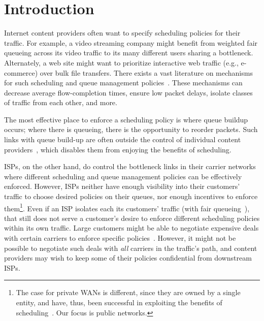 \section{Introduction}\label{s:intro}

Internet content providers often want to specify scheduling policies for their traffic. 
For example, a video streaming company might benefit from weighted fair queueing across its video traffic to its many different users sharing a bottleneck. Alternately, a web site might want to prioritize interactive web traffic (e.g., e-commerce) over bulk file transfers. 
There exists a vast literature on mechanisms for such scheduling and queue management policies~\cite{diffserv, fair-queueing, sfq, pie, CoDel, fifoplus, virtualClocks, csfq, drr, red, ecn}.
These mechanisms can decrease average flow-completion times, ensure low packet delays, isolate classes of traffic from each other, and more.

The most effective place to enforce a scheduling policy is where queue buildup occurs; where there is queueing, there is the opportunity to reorder packets. Such links with queue build-up are often outside the control of individual content 
providers~\cite{inferring-interdomain-congestion, isp-throttle-1, isp-throttle-2, isp-throttle-3}, which disables them from enjoying the benefits of scheduling.

ISPs, on the other hand, do control the bottleneck links in their carrier networks where different scheduling and queue management policies can be effectively enforced. 
However, ISPs neither have enough visibility into their customers' traffic to choose desired policies on their queues, nor enough incentives to enforce them\footnote{The case for private WANs is different, since they are owned by a single entity, and have, thus, been successful in exploiting the benefits of scheduling~\cite{swan, b4, bwe}. Our focus is public networks.}. Even if an ISP isolates each its customers' traffic (\eg with fair queueing~\cite{fair-queueing}), that still does not serve a customer's desire to enforce different scheduling policies within its own traffic.  
Large customers might be able to negotiate expensive deals with certain carriers to enforce specific policies~\cite{att-qos}. 
However, it might not be possible to negotiate such deals with \emph{all} carriers in the traffic's path, and content providers may wish to keep some of their policies confidential from downstream ISPs. 


